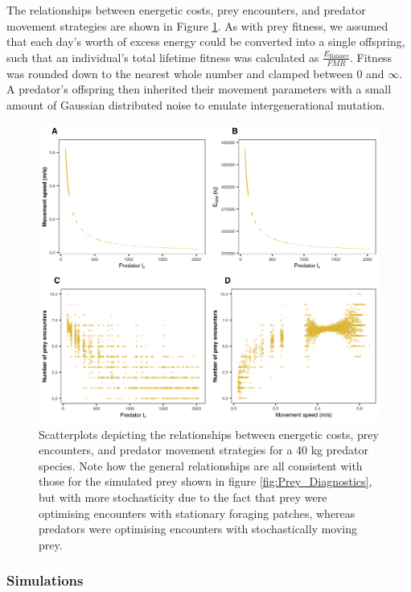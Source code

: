 \documentclass[12pt]{article}
\begin{document}
The relationships between energetic costs, prey encounters, and predator movement strategies are shown in Figure \ref{fig:Pred_Diagnostics}. As with prey fitness, we assumed that each day’s worth of excess energy could be converted into a single offspring, such that an individual's total lifetime fitness was calculated as $\frac{E_{\mathrm{Balance}}}{FMR}$. Fitness was rounded down to the nearest whole number and clamped between 0 and $\infty$. A predator's offspring then inherited their movement parameters with a small amount of Gaussian distributed noise to emulate intergenerational mutation.

\begin{figure}[!h]
\centering
\includegraphics[scale=1]{Predator_Diagnostics.png}
\caption{Scatterplots depicting the relationships between energetic costs, prey encounters, and predator movement strategies for a 40 kg predator species. Note how the general relationships are all consistent with those for the simulated prey shown in figure \ref{fig:Prey_Diagnostics}, but with more stochasticity due to the fact that prey were optimising encounters with stationary foraging patches, whereas predators were optimising encounters with stochastically moving prey.}
\label{fig:Pred_Diagnostics}
\end{figure}



\subsubsection*{Simulations}
\end{document}
